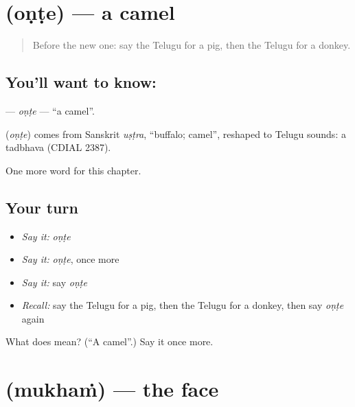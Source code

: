 \section[\texorpdfstring{\te{ఒంటె} (oṇṭe)}{ఒంటె (oṇṭe)}]{ (oṇṭe) — a camel}

\label{lesson:TE-C126-onte}



\begin{quote}
Before the new one: say the Telugu for a pig, then the Telugu for a donkey.
\end{quote}

\subsection*{You'll want to know: }
\textbf{} — \emph{oṇṭe} — \textquotedblleft{}a camel\textquotedblright{}.

\begin{cousinweb}
\textbf{} (\emph{oṇṭe}) comes from Sanskrit \emph{uṣṭra}, \textquotedblleft{}buffalo; camel\textquotedblright{}, reshaped to Telugu sounds: a tadbhava (CDIAL 2387).
\end{cousinweb}

\begin{grammarlens}[title={What you've built}]
One more word for this chapter.
\end{grammarlens}

\subsection*{Your turn}
\begin{itemize}
\raggedright
  \item \emph{Say it:} \emph{oṇṭe}
  \item \emph{Say it:} \emph{oṇṭe}, once more
  \item \emph{Say it:} say \emph{oṇṭe}
  \item \emph{Recall:} say the Telugu for a pig, then the Telugu for a donkey, then say \emph{oṇṭe} again
\end{itemize}

\begin{tcolorbox}[breakable,colback=teal!4,colframe=teal!35!black,title={Before you move on}]
What does  mean? (\textquotedblleft{}A camel\textquotedblright{}.) Say it once more.
\end{tcolorbox}
\section[\texorpdfstring{\te{ముఖం} (mukhaṁ)}{ముఖం (mukhaṁ)}]{ (mukhaṁ) — the face}


